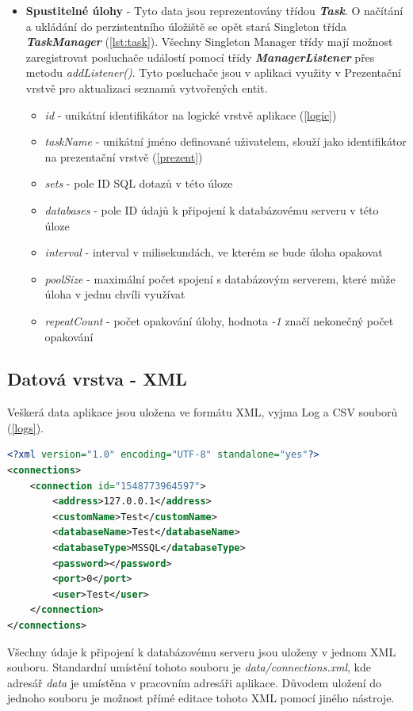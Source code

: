 \documentclass[czech,bachelor,public,dept460,male,cpdeclaration,twoside]{diploma}
\begin{document}
\begin{itemize}
  \item \textbf{Spustitelné úlohy} - Tyto data jsou reprezentovány třídou \textbf{\emph{Task}}. O načítání a ukládání do perzistentního úložiště se opět stará Singleton třída \textbf{\emph{TaskManager}} (\ref{lst:task}).
Všechny Singleton Manager třídy mají možnost zaregistrovat posluchače událostí pomocí třídy \textbf{\emph{ManagerListener}} přes metodu \textit{addListener()}. Tyto posluchače jsou v aplikaci využity v Prezentační vrstvě pro aktualizaci seznamů vytvořených entit.
    \begin{itemize}
  	\item \textit{id} - unikátní identifikátor na logické vrstvě aplikace (\ref{logic})
  	\item \textit{taskName} - unikátní jméno definované uživatelem, slouží jako identifikátor  na prezentační vrstvě (\ref{prezent})
  	\item \textit{sets} - pole ID SQL dotazů v této úloze
  	\item \textit{databases} - pole ID údajů k připojení k databázovému serveru v této úloze
  	\item \textit{interval} - interval v milisekundách, ve kterém se bude úloha opakovat
  	\item \textit{poolSize} - maximální počet spojení s databázovým serverem, které může úloha v jednu chvíli využívat
  	\item \textit{repeatCount} - počet opakování úlohy, hodnota \textit{-1} značí nekonečný počet opakování
    \end{itemize}
\end{itemize}

\newpage
\subsection{Datová vrstva - XML} \label{xml}
Veškerá data aplikace jsou uložena ve formátu XML, vyjma Log a CSV souborů (\ref{logs}).\newline

\begin{minipage}{\linewidth}
\begin{lstlisting}[caption=Údaje k připojení k databázovému serveru ve formátu XML\label{lst:con},language=XML] 
<?xml version="1.0" encoding="UTF-8" standalone="yes"?>
<connections>
    <connection id="1548773964597">
        <address>127.0.0.1</address>
        <customName>Test</customName>
        <databaseName>Test</databaseName>
        <databaseType>MSSQL</databaseType>
        <password></password>
        <port>0</port>
        <user>Test</user>
    </connection>
</connections>
\end{lstlisting}
Všechny údaje k připojení k databázovému serveru jsou uloženy v jednom XML souboru. Standardní umístění tohoto souboru je \textit{data/connections.xml}, kde adresář \textit{data} je umístěna v pracovním adresáři aplikace. Důvodem uložení do jednoho souboru je možnost přímé editace tohoto XML pomocí jiného nástroje.
\end{minipage}
\end{document}
